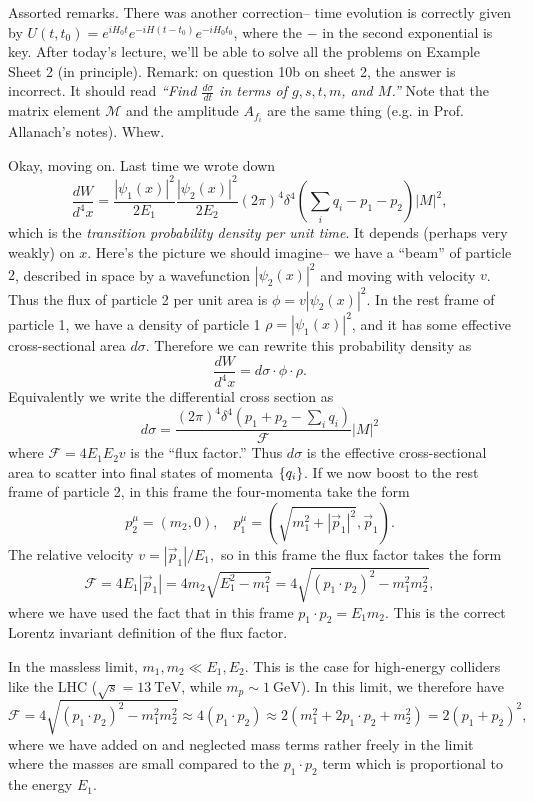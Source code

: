 Assorted remarks. There was another correction-- time evolution is correctly given by $U(t,t_0)=e^{iH_0 t} e^{-iH(t-t_0)} e^{-iH_0 t_0}$, where the $-$ in the second exponential is key. After today's lecture, we'll be able to solve all the problems on Example Sheet 2 (in principle). Remark: on question 10b on sheet 2, the answer is incorrect. It should read \textit{``Find $\frac{d\sigma}{dt}$ in terms of $g,s,t,m$, and $M$.''} Note that the matrix element $\mathcal{M}$ and the amplitude $A_{f_i}$ are the same thing (e.g. in Prof. Allanach's notes). Whew.

Okay, moving on. Last time we wrote down
$$\frac{dW}{d^4x}=\frac{|\psi_1 (x)|^2}{2E_1}\frac{|\psi_2(x)|^2}{2E_2}(2\pi)^4 \delta^4(\sum_i q_i-p_1-p_2)|M|^2,$$ which is the \emph{transition probability density per unit time}. It depends (perhaps very weakly) on $x$. Here's the picture we should imagine-- we have a ``beam'' of particle $2$, described in space by a wavefunction $|\psi_2(x)|^2$ and moving with velocity $v$. Thus the flux of particle 2 per unit area is 
$\phi=v|\psi_2(x)|^2.$ In the rest frame of particle 1, we have a density of particle 1 $\rho=|\psi_1(x)|^2$, and it has some effective cross-sectional area $d\sigma$. Therefore we can rewrite this probability density as
$$\frac{dW}{d^4x}=d\sigma\cdot \phi \cdot \rho.$$
Equivalently we write the differential cross section as
$$d\sigma = \frac{(2\pi)^4 \delta^4(p_1 +p_2 -\sum_i q_i)}{\mathcal{F}}|M|^2$$
where $\mathcal{F}=4E_1E_2 v$ is the ``flux factor.'' Thus $d\sigma$ is the effective cross-sectional area to scatter into final states of momenta $\{q_i\}$. If we now boost to the rest frame of particle 2, in this frame the four-momenta take the form
$$p_2^\mu=(m_2,0),\quad p_1^\mu=(\sqrt{m_1^2+|\vec p_1|^2},\vec p_1).$$
The relative velocity $v=|\vec p_1|/E_1,$ so in this frame the flux factor takes the form
$$\mathcal{F}=4E_1|\vec p_1|=4m_2\sqrt{E_1^2-m_1^2}=4\sqrt{(p_1 \cdot p_2)^2-m_1^2m_2^2},$$
where we have used the fact that in this frame $p_1\cdot p_2 = E_1m_2$. This is the correct Lorentz invariant definition of the flux factor.

In the massless limit, $m_1,m_2\ll E_1,E_2$. This is the case for high-energy colliders like the LHC ($\sqrt{s}=\SI{13}{\tera\electronvolt}$, while $m_p\sim \SI{1}{\giga\electronvolt}$). 
In this limit, we therefore have
$$\mathcal{F}=4\sqrt{(p_1 \cdot p_2)^2-m_1^2m_2^2}\approx 4(p_1\cdot p_2) \approx 2(m_1^2+2 p_1\cdot p_2 +m_2^2) =2(p_1+p_2)^2,$$
where we have added on and neglected mass terms rather freely in the limit where the masses are small compared to the $p_1\cdot p_2$ term which is proportional to the energy $E_1$.

